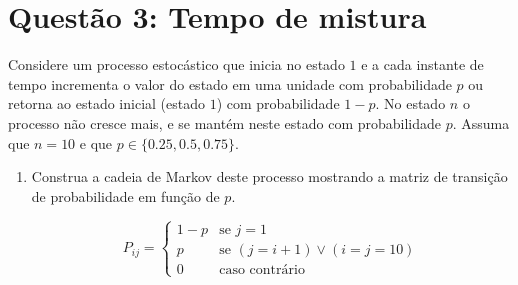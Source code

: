 \section*{Questão 3: Tempo de mistura}
Considere um processo estocástico que inicia no estado $1$ e a cada instante de tempo incrementa o valor do estado em uma unidade com probabilidade $p$ ou retorna ao estado inicial (estado $1$) com probabilidade $1-p$. No estado $n$ o processo não cresce mais, e se mantém neste estado com probabilidade $p$. Assuma que $n = 10$ e que $p \in \{0.25, 0.5, 0.75\}$.

\begin{enumerate}
    \item Construa a cadeia de Markov deste processo mostrando a matriz de transição de probabilidade em função de $p$.
    \begin{resposta}


        $$
        P_{ij} = \begin{cases}
            1-p & \text{se } j = 1 \\
            p & \text{se } (j = i + 1) \lor (i=j=10)\\
            0 & \text{caso contrário}
        \end{cases}
        $$


\end{resposta}
\end{enumerate}
